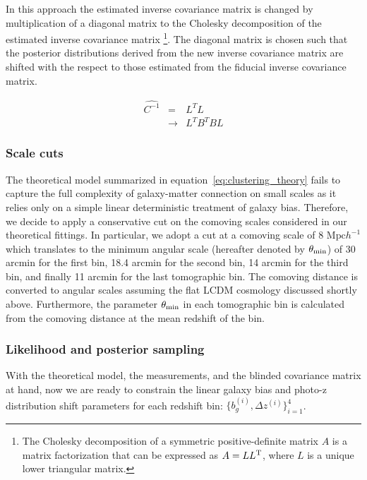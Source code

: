 \documentclass[fleqn,usenatbib,useAMS]{mnras}
\begin{document}
In this approach the estimated inverse covariance matrix is changed by multiplication of a diagonal matrix to the Cholesky decomposition of the estimated inverse covariance matrix \footnote{The Cholesky decomposition of a symmetric positive-definite matrix $A$ is a matrix factorization that can be expressed as $A = LL^{\rm T}$, where $L$ is a unique lower triangular matrix.}. The diagonal matrix is chosen such that the posterior distributions derived from the new inverse covariance matrix are shifted with the respect to those estimated from the fiducial inverse covariance matrix. 

\begin{eqnarray}
\widehat{C^{-1}} &=& L^{T}L \\
             &\rightarrow& L^{T}B^{T}BL \label{eq:blinded}
\end{eqnarray}

\subsubsection{Scale cuts}\label{sec:scale_cu}

The theoretical model summarized in equation~\ref{eq:clustering_theory} fails to capture the full complexity of galaxy-matter connection on small scales as it relies only on a simple linear deterministic treatment of galaxy bias. Therefore, we decide to apply a conservative cut on the comoving scales considered in our theoretical fittings. In particular, we adopt a cut at a comoving scale of 8 $\mathrm{Mpc}h^{-1}$ which translates to the minimum angular scale (hereafter denoted by $\theta_{\rm min}$) of 30 arcmin for the first bin, 18.4 arcmin for the second bin, 14 arcmin for the third bin, and finally 11 arcmin for the last tomographic bin. The comoving distance is converted to angular scales assuming the flat LCDM cosmology discussed shortly above. Furthermore, the parameter $\theta_{\rm min}$ in each tomographic bin is calculated from the comoving distance at the mean redshift of the bin.

\subsubsection{Likelihood and posterior sampling}

With the theoretical model, the measurements, and the blinded covariance matrix at hand, now we are ready to constrain the linear galaxy bias and photo-z distribution shift parameters for each redshift bin: $\{b_{g}^{(i)}, \Delta z^{(i)}\}_{i=1}^{4}$. 
\end{document}

